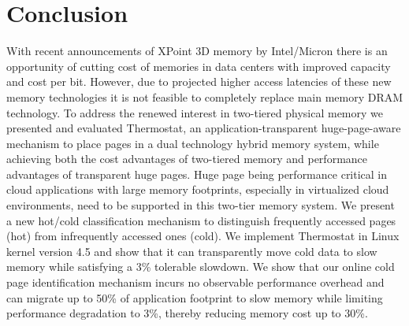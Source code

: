 \section{Conclusion}
\label{conclusion}
With recent announcements of XPoint 3D memory by Intel/Micron there is an
opportunity of cutting cost of memories in data centers with improved capacity
and cost per bit. However, due to projected higher access latencies of these new
memory technologies it is not feasible to completely replace main memory DRAM
technology. To address the renewed interest in two-tiered physical memory we
presented and evaluated Thermostat, an application-transparent huge-page-aware
mechanism to place pages in a dual technology hybrid memory system, while
achieving both the cost advantages of two-tiered memory and performance
advantages of transparent huge pages. Huge page being performance critical in
cloud applications with large memory footprints, especially in virtualized cloud
environments, need to be supported in this two-tier memory system. We present a
new hot/cold classification mechanism to distinguish frequently accessed pages
(hot) from infrequently accessed ones (cold).  We implement Thermostat in
Linux kernel version 4.5 and show that it can transparently move cold data to slow memory
while satisfying a 3\% tolerable slowdown. We show that our online
cold page identification mechanism incurs no observable performance overhead and
can migrate up to 50\% of application footprint to slow memory while limiting
performance degradation to 3\%, thereby reducing memory cost up to 30\%.
%
